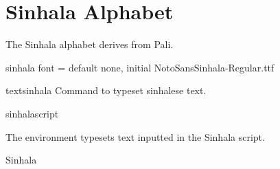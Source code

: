 
\section{Sinhala Alphabet}
\label{s:sinhala}

The Sinhala alphabet derives from Pali.


\begin{docKey}[phd]{sinhala font}{ = }{default none, initial NotoSansSinhala-Regular.ttf}
\end{docKey}

\begin{docCommand}{textsinhala}{}
Command to typeset sinhalese text.
\end{docCommand}

\begin{docEnvironment}{sinhalascript}{}{}
\end{docEnvironment}

The  environment typesets text inputted in the Sinhala script.

\begin{scriptexample}[]{Sinhala}
\end{scriptexample}

